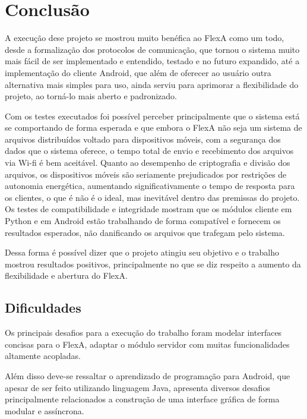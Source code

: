 \chapter{Conclusão}

    A execução dese projeto se mostrou muito benéfica ao FlexA como um todo, desde a formalização dos protocolos de comunicação, que tornou o sistema muito mais fácil de ser implementado e entendido, testado e no futuro expandido, até a implementação do cliente Android, que além de oferecer ao usuário outra alternativa mais simples para uso, ainda serviu para aprimorar a flexibilidade do projeto, ao torná-lo mais aberto e padronizado.
    
    Com os testes executados foi possível perceber principalmente que o sistema está se comportando de forma esperada e que embora o FlexA não seja um sistema de arquivos distribuídos voltado para dispositivos móveis, com a segurança dos dados que o sistema oferece, o tempo total de envio e recebimento dos arquivos via Wi-fi é bem aceitável. Quanto ao desempenho de criptografia e divisão dos arquivos, os dispositivos móveis são seriamente prejudicados por restrições de autonomia energética, aumentando significativamente o tempo de resposta para os clientes, o que é não é o ideal, mas inevitável dentro das premissas do projeto. Os testes de compatibilidade e integridade mostram que os módulos cliente em Python e em Android estão trabalhando de forma compatível e fornecem os resultados esperados, não danificando os arquivos que trafegam pelo sistema.
    
    Dessa forma é possível dizer que o projeto atingiu seu objetivo e o trabalho mostrou resultados positivos, principalmente no que se diz respeito a aumento da flexibilidade e abertura do FlexA.
    
    
    \section{Dificuldades}
    
    Os principais desafios para a execução do trabalho foram modelar interfaces concisas para o FlexA, adaptar o módulo servidor com muitas funcionalidades altamente acopladas. 
    
    Além disso deve-se ressaltar o aprendizado de programação para Android, que apesar de ser feito utilizando linguagem Java, apresenta diversos desafios principalmente relacionados a construção de uma interface gráfica de forma modular e assíncrona.
    
